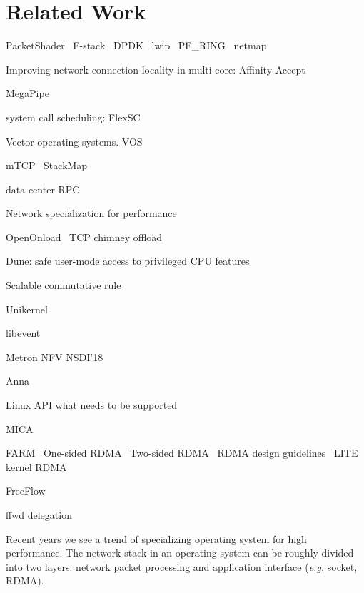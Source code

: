 \section{Related Work}
\label{sec:related}

PacketShader~\cite{han2010packetshader}
F-stack~\cite{fstack}
DPDK~\cite{dpdk} lwip~\cite{dunkels2001design}
PF\_RING~\cite{pf_ring}
netmap~\cite{rizzo2012netmap}

Improving network connection locality in multi-core:
Affinity-Accept~\cite{pesterev2012improving}


MegaPipe~\cite{han2012megapipe}

system call scheduling:
FlexSC~\cite{soares2010flexsc}

Vector operating systems.
VOS~\cite{vasudevan2011case}

mTCP~\cite{jeong2014mtcp}
StackMap~\cite{yasukata2016stackmap}

data center RPC~\cite{stuedi2014darpc}

Network specialization for performance~\cite{marinos2014network}

OpenOnload~\cite{openonload}
TCP chimney offload~\cite{networking2004network}

Dune: safe user-mode access to privileged CPU features~\cite{belay2012dune}

Scalable commutative rule~\cite{clements2015scalable}

Unikernel~\cite{madhavapeddy2013unikernels}

libevent~\cite{libevent}

Metron NFV NSDI'18~\cite{metron2018nsdi}

Anna~\cite{anna}

Linux API what needs to be supported~\cite{tsai2016study}

MICA~\cite{lim2014mica}

FARM~\cite{dragojevic2014farm}
One-sided RDMA~\cite{mitchell2013using}
Two-sided RDMA~\cite{kalia2014using}
RDMA design guidelines~\cite{kaminsky2016design}
LITE kernel RDMA~\cite{tsai2017lite}

FreeFlow~\cite{freeflow}


ffwd delegation~\cite{roghanchi2017ffwd}

Recent years we see a trend of specializing operating system for high performance.
The network stack in an operating system can be roughly divided into two layers: network packet processing and application interface (\textit{e.g.} socket, RDMA).

